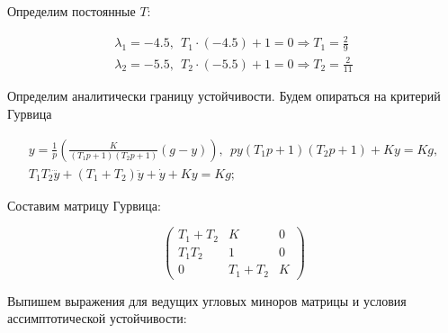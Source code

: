
\begin{par}
\begin{flushleft}
Определим постоянные $T$:
\end{flushleft}
\end{par}

\begin{par}
$$\begin{array}{l}
\lambda_1 =-4.5,~~T_1 \cdot (-4.5)+1=0\Rightarrow T_1 =\frac{2}{9}\\
\lambda_2 =-5.5,~~T_2 \cdot (-5.5)+1=0\Rightarrow T_2 =\frac{2}{11}
\end{array}$$
\end{par}

\begin{par}
\begin{flushleft}
Определим аналитически границу устойчивости. Будем опираться на критерий Гурвица
\end{flushleft}
\end{par}

\begin{par}
$$\begin{array}{l}
y=\frac{1}{p}\left(\frac{K}{(T_1 p+1)(T_2 p+1)}(g-y)\right),~~py(T_1 p+1)(T_2 p+1)+Ky=Kg,\\
T_1 T_2 \dddot{y} +(T_1 +T_2 )\ddot{y} +\dot{y} +Ky=Kg;
\end{array}$$
\end{par}

\begin{par}
\begin{flushleft}
Составим матрицу Гурвица:
\end{flushleft}
\end{par}

\begin{par}
$$\left(\begin{array}{ccc}
T_1 +T_2  & K & 0\\
T_1 T_2  & 1 & 0\\
0 & T_1 +T_2  & K
\end{array}\right)$$
\end{par}

\begin{par}
\begin{flushleft}
Выпишем выражения для ведущих угловых миноров матрицы и условия ассимптотической устойчивости:
\end{flushleft}
\end{par}


